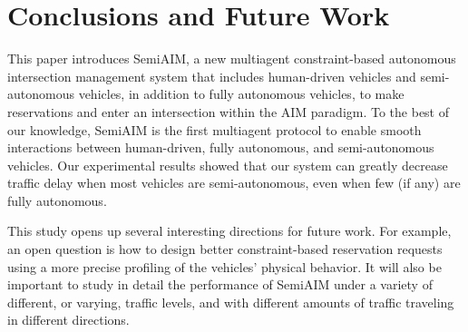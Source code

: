 \section{Conclusions and Future Work}
\label{sec:conclusions}

This paper introduces SemiAIM, a new multiagent constraint-based
autonomous intersection management system that includes human-driven
vehicles and semi-autonomous vehicles, in addition to fully autonomous
vehicles, to make reservations and enter an intersection within the
AIM paradigm.  To the best of our knowledge, SemiAIM is the first
multiagent protocol to enable smooth interactions between
human-driven, fully autonomous, and semi-autonomous vehicles.  Our
experimental results showed that our system can greatly decrease
traffic delay when most vehicles are semi-autonomous, even when few
(if any) are fully autonomous.

This study opens up several interesting directions for future work.
For example, an open question is how to design better constraint-based
reservation requests using a more precise profiling of the vehicles'
physical behavior.  It will also be important to study in detail the
performance of SemiAIM under a variety of different, or varying,
traffic levels, and with different amounts of traffic traveling in
different directions.










